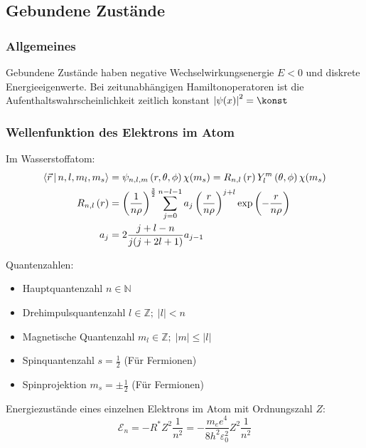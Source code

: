 \documentclass[11pt]{article}
\numberwithin{equation}{section}
\begin{document}
    \subsection{Gebundene Zustände}
      \subsubsection{Allgemeines}
        Gebundene Zustände haben negative Wechselwirkungsenergie $E<0$ und diskrete Energieeigenwerte. Bei zeitunabhängigen Hamiltonoperatoren ist die Aufenthaltswahrscheinlichkeit zeitlich konstant $\left|\psi(x)\right|^2=\konst$

      \subsubsection{Wellenfunktion des Elektrons im Atom}
        Im Wasserstoffatom:
        \begin{equation}
          \begin{aligned}
            \Braket{\vec{r}|n,l,m_l,m_s} &= \psi_{n,l,m}\left(r,\theta,\phi\right)\chi(m_s)
            = R_{n,l}\left(r\right) Y_l^m\left(\theta,\phi\right)\chi(m_s) \\
            R_{n,l}\left(r\right)
            &= \left(\frac{1}{n\rho}\right)^{\frac{3}{2}}
            \sum_{j=0}^{n-l-1} a_j \left(\frac{r}{n\rho}\right)^{j+l} \exp\left({-\frac{r}{n\rho}}\right) \\
            a_j &= 2\frac{j+l-n}{j(j+2l+1)} a_{j-1} \\
          \end{aligned}
        \end{equation}

        Quantenzahlen:
        \begin{itemize}
          \item Hauptquantenzahl $n \in \mathbb{N}$
          \item Drehimpulsquantenzahl $l \in \mathbb{Z};\; \left|l\right| < n$
          \item Magnetische Quantenzahl $m_l \in \mathbb{Z};\; \left|m\right| \le \left|l\right|$
          \item Spinquantenzahl $s = \frac{1}{2}$ (Für Fermionen)
          \item Spinprojektion $m_s = \pm \frac{1}{2}$ (Für Fermionen)
        \end{itemize}

        Energiezustände eines einzelnen Elektrons im Atom mit Ordnungszahl $Z$:
        \begin{equation}
          \mathcal{E}_n = -R^* Z^2 \frac{1}{n^2} = - \frac{m_e e^4}{8 h^2 \varepsilon_0^2} Z^2 \frac{1}{n^2}
        \end{equation}
\end{document}
